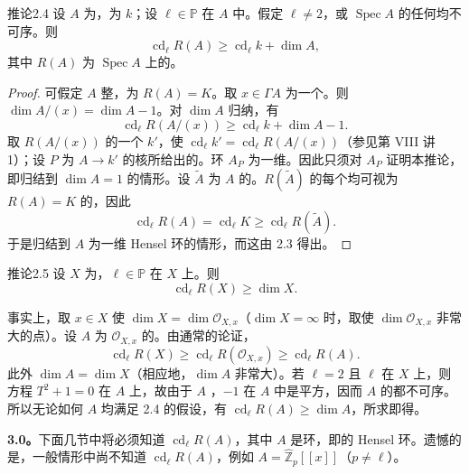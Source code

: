 \begin{SGAresult}{推论}{2.4}
设 $A$ 为，为 $k$；设 $\ell\in\mathbb P$ 在 $A$ 中。假定 $\ell\ne2$，或 $\operatorname{Spec}A$ 的任何均不可序。则
\[
 \operatorname{cd}_\ell R(A)\geq\operatorname{cd}_\ell k+\dim A,
\]
其中 $R(A)$ 为 $\operatorname{Spec}A$ 上的。
\end{SGAresult}
\begin{proof}
可假定 $A$ 整，为 $R(A)=K$。取 $x\in\Gamma A$ 为一个。则 $\dim A/(x)=\dim A-1$。对 $\dim A$ 归纳，有
\[
 \operatorname{cd}_\ell R(A/(x))\geq\operatorname{cd}_\ell k+\dim A-1.
\]
取 $R(A/(x))$ 的一个 $k'$，使 $\operatorname{cd}_\ell k'=\operatorname{cd}_\ell R(A/(x))$（参见第 VIII 讲 1）；设 $P$ 为 $A\to k'$ 的核所给出的。环 $A_P$ 为一维。因此只须对 $A_P$ 证明本推论，即归结到 $\dim A=1$ 的情形。设 $\widetilde A$ 为 $A$ 的。$R(\widetilde A)$ 的每个均可视为 $R(A)=K$ 的，因此
\[
 \operatorname{cd}_\ell R(A)=\operatorname{cd}_\ell K\geq\operatorname{cd}_\ell R(\widetilde A).
\]
于是归结到 $A$ 为一维 Hensel 环的情形，而这由 2.3 得出。
\end{proof}
\begin{SGAresult}{推论}{2.5}
设 $X$ 为，$\ell\in\mathbb P$ 在 $X$ 上。则
\[
 \operatorname{cd}_\ell R(X)\geq\dim X.
\]
\end{SGAresult}
事实上，取 $x\in X$ 使 $\dim X=\dim\mathcal O_{X,x}$（$\dim X=\infty$ 时，取使 $\dim\mathcal O_{X,x}$ 非常大的点）。设 $A$ 为 $\mathcal O_{X,x}$ 的。由通常的论证，
\[
 \operatorname{cd}_\ell R(X)\geq\operatorname{cd}_\ell R(\mathcal O_{X,x})\geq\operatorname{cd}_\ell R(A).
\]
此外 $\dim A=\dim X$（相应地，$\dim A$ 非常大）。若 $\ell=2$ 且 $\ell$ 在 $X$ 上，则方程 $T^2+1=0$ 在 $A$ 上，故由于 $A$ ，$-1$ 在 $A$ 中是平方，因而 $A$ 的都不可序。所以无论如何 $A$ 均满足 2.4 的假设，有 $\operatorname{cd}_\ell R(A)\geq\dim A$，所求即得。

\textbf{3.0。}下面几节中将必须知道 $\operatorname{cd}_\ell R(A)$，其中 $A$ 是环，即的 Hensel 环。遗憾的是，一般情形中尚不知道 $\operatorname{cd}_\ell R(A)$，例如 $A=\widehat{\mathbb Z}_p[[x]]$（$p\ne\ell$）。

